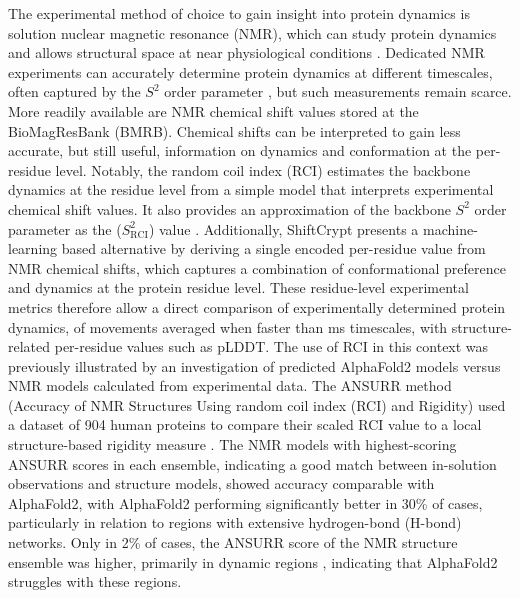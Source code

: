 The experimental method of choice to gain insight into protein dynamics is solution nuclear magnetic resonance (NMR), which can study protein dynamics and allows structural space at near physiological conditions \cite{van_den_bedem_integrative_2015}. Dedicated NMR experiments can accurately determine protein dynamics at different timescales, often captured by the $S^{2}$ order parameter \cite{barbato_backbone_1992}, but such measurements remain scarce. More readily available are NMR chemical shift values \cite{gaspari_biomagresbank_2020} stored at the BioMagResBank (BMRB). Chemical shifts can be interpreted to gain less accurate, but still useful, information on dynamics and conformation at the per-residue level. Notably, the random coil index (RCI) estimates the backbone dynamics at the residue level from a simple model that interprets experimental chemical shift values. It also provides an approximation of the backbone $S^{2}$ order parameter as the ($S^{2}_{\text{RCI}}$) value \cite{berjanskii_simple_2005, berjanskii_application_2008}. Additionally, ShiftCrypt \cite{orlando_shiftcrypt_2020} presents a machine-learning based alternative by deriving a single encoded per-residue value from NMR chemical shifts, which captures a combination of conformational preference and dynamics at the protein residue level. These residue-level experimental metrics therefore allow a direct comparison of experimentally determined protein dynamics, of movements averaged when faster than ms timescales, with structure-related per-residue values such as pLDDT. The use of RCI in this context was previously illustrated by an investigation of predicted AlphaFold2 models versus NMR models calculated from experimental data. The ANSURR method (Accuracy of NMR Structures Using random coil index (RCI) and Rigidity) used a dataset of 904 human proteins \cite{fowler2022accuracy} to compare their scaled RCI value to a local structure-based rigidity measure \cite{fowler2020method}. The NMR models with highest-scoring ANSURR scores in each ensemble, indicating a good match between in-solution observations and structure models, showed accuracy comparable with AlphaFold2, with AlphaFold2 performing significantly better in 30\% of cases, particularly in relation to regions with extensive hydrogen-bond (H-bond) networks. Only in 2\% of cases, the ANSURR score of the NMR structure ensemble was higher, primarily in dynamic regions \cite{fowler2022accuracy}, indicating that AlphaFold2 struggles with these regions. 

